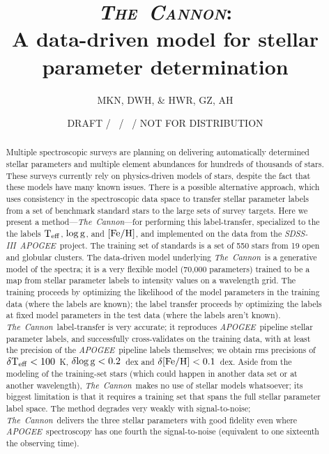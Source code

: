\documentclass[12pt, preprint]{aastex}
\newcommand{\teff}{\mbox{$\rm T_{eff}$}}
\newcommand{\feh}{\mbox{$\rm [Fe/H]$}}
\newcommand{\logg}{\mbox{$\rm \log g$}}
\newcommand{\tc}{\textsl{The~Cannon}}
\newcommand{\apogee}{\textsl{APOGEE}}
\newcommand{\sdss}{\textsl{SDSS-III}}
\begin{document}
\title{\textsc{\tc:}\\ A data-driven model for stellar parameter determination}
\author{
  MKN,
  DWH,
  \&
  HWR,
  GZ, AH} 
\date{DRAFT / \gitdate\ / \githash\ / NOT FOR DISTRIBUTION}



\begin{abstract}%

Multiple spectroscopic surveys are planning on delivering
automatically determined stellar parameters and multiple element
abundances for hundreds of thousands of stars.
These surveys currently rely on physics-driven models of stars,
despite the fact that these models have many known issues.
There is a possible alternative approach, which uses consistency in
the spectroscopic data space to transfer stellar parameter labels from
a set of benchmark standard stars to the large sets of survey targets.
Here we present a method---\tc---for performing this label-transfer,
specialized to the the labels \teff, \logg, and \feh, and implemented on 
the data from the \sdss\ \apogee\ project.
The training set of standards is a set of 550 stars from 19
open and globular clusters.
The data-driven model underlying \tc\ is a generative model of the
spectra; it is a very flexible model (70,000 parameters) trained to be
a map from stellar parameter labels to intensity values on a wavelength
grid.
The training proceeds by optimizing the likelihood of the model
parameters in the training data (where the labels are known); the label
transfer proceeds by optimizing the labels at fixed
model parameters in the test data (where the labels aren't known).
\tc\ label-transfer is very accurate; it reproduces \apogee\ pipeline
stellar parameter labels, and successfully cross-validates on the
training data, with at least the precision of the \apogee\ pipeline
labels themselves; we obtain rms precisions of $\delta\teff< 100$~K,
$\delta\logg< 0.2$~dex and $\delta\feh< 0.1$~dex.
Aside from the modeling of the training-set stars (which could happen
in another data set or at another wavelength), \tc\ makes no use of
stellar models whatsoever; its biggest limitation is that it requires a
training set that spans the full stellar parameter label space.
The method degrades very weakly with signal-to-noise; \tc\ delivers
the three stellar parameters with good fidelity even where
\apogee\ spectroscopy has one fourth the
signal-to-noise (equivalent to one sixteenth the observing time).

\end{abstract}
\end{document}
